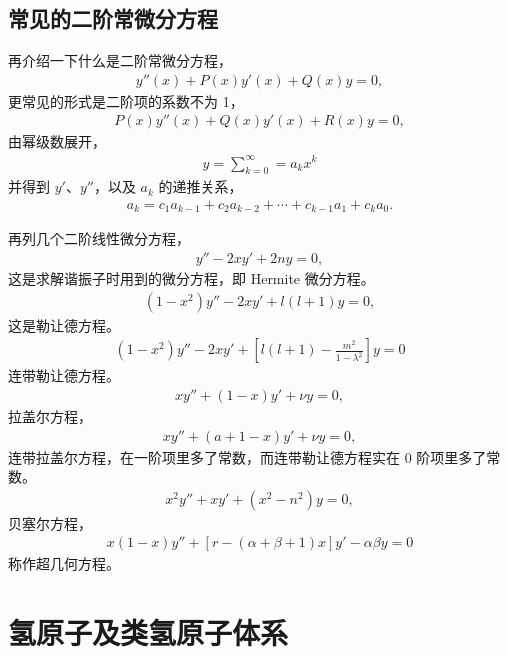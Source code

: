 \section{常见的二阶常微分方程}
再介绍一下什么是二阶常微分方程，
\begin{align}
    y''(x) + P(x) y'(x) + Q(x) y = 0,
\end{align}
更常见的形式是二阶项的系数不为 1，
\begin{align}
    P(x) y''(x) + Q(x) y'(x) + R(x) y = 0,
\end{align}
由幂级数展开，
\begin{align}
    y = \sum_{k=0}^\infty = a_k x^k 
\end{align}
并得到 $y'$、$y''$，以及 $a_k$ 的递推关系，
\begin{align}
    a_k = c_1 a_{k-1} + c_2 a_{k-2} + \cdots + c_{k-1} a_1 + c_k a_0.
\end{align}

再列几个二阶线性微分方程，
\begin{align}
    y'' - 2x y' + 2ny =0,
\end{align}
这是求解谐振子时用到的微分方程，即 Hermite 微分方程。
\begin{align}
    (1-x^2) y'' - 2x y' + l(l+1) y = 0,
\end{align}
这是勒让德方程。
\begin{align}
    (1-x^2) y'' - 2x y' + \left[
        l(l+1) - \frac{m^2}{1-\lambda^2}
    \right] y = 0
\end{align}
连带勒让德方程。
\begin{align}
    x y'' + (1-x) y' + \nu y = 0,
\end{align}
拉盖尔方程，
\begin{align}
    x y'' + (a+1 - x)y' + \nu y = 0,
\end{align}
连带拉盖尔方程，在一阶项里多了常数，而连带勒让德方程实在 0 阶项里多了常数。
\begin{align}
    x^2 y'' + x y' + (x^2 - n^2) y = 0,
\end{align}
贝塞尔方程，
\begin{align}
    x(1-x) y'' + [r - (\alpha + \beta + 1)x] y' - \alpha \beta y =0
\end{align}
称作超几何方程。


\chapter{氢原子及类氢原子体系}

